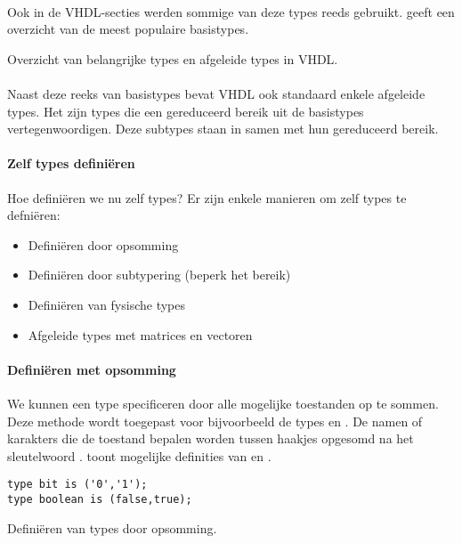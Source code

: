 \paragraph{}
Ook in de VHDL-secties werden sommige van deze types reeds gebruikt.  geeft een overzicht van de meest populaire basistypes.
\begin{table}[hbt]
\centering
{}
\caption{Overzicht van belangrijke types en afgeleide types in VHDL.}
\end{table}

\paragraph{}
Naast deze reeks van basistypes bevat VHDL ook standaard enkele afgeleide types. Het zijn types die een gereduceerd bereik uit de basistypes vertegenwoordigen. Deze subtypes staan in  samen met hun gereduceerd bereik.
\paragraph{Zelf types defini\"eren} Hoe defini\"eren we nu zelf types? Er zijn enkele manieren om zelf types te defni\"eren:
\begin{itemize}
 \item Defini\"eren door opsomming
 \item Defini\"eren door subtypering (beperk het bereik)
 \item Defini\"eren van fysische types
 \item Afgeleide types met matrices en vectoren
\end{itemize}
\paragraph{Defini\"eren met opsomming} We kunnen een type specificeren door alle mogelijke toestanden op te sommen. Deze methode wordt toegepast voor bijvoorbeeld de types  en . De namen of karakters die de toestand bepalen worden tussen haakjes opgesomd na het sleutelwoord .  toont mogelijke definities van  en .
\begin{vhdlcode}[hbt]
\begin{lstlisting}
type bit is ('0','1');
type boolean is (false,true);
\end{lstlisting}
\caption{Defini\"eren van types door opsomming.}
\label{lst:constante}
\end{vhdlcode}

